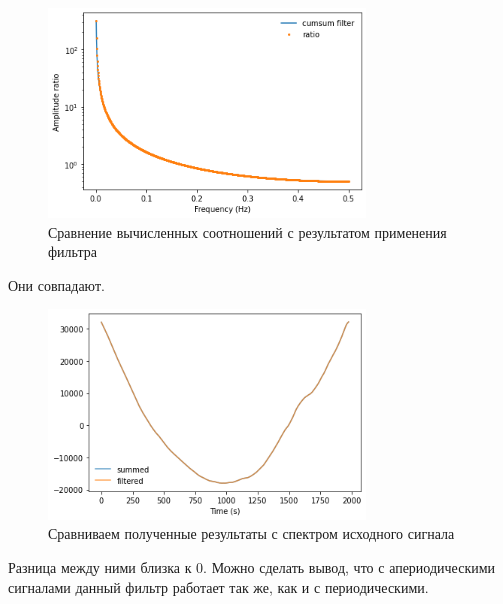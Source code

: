 \documentclass[a4paper, 12pt]{report}
\begin{document}
	\begin{figure}[H]
		\centering
		\includegraphics[width=0.75\textwidth]{test7.png}
		\caption{Сравнение вычисленных соотношений с результатом применения фильтра}
		\label{fig:test7}
	\end{figure}
	Они совпадают.
	\begin{figure}[H]
		\centering
		\includegraphics[width=0.75\textwidth]{test8.png}
		\caption{Сравниваем полученные результаты с спектром исходного сигнала}
		\label{fig:test8}
	\end{figure}
	Разница между ними близка к 0. Можно сделать вывод, что с апериодическими сигналами данный фильтр работает так же, как и с периодическими.
\end{document}
